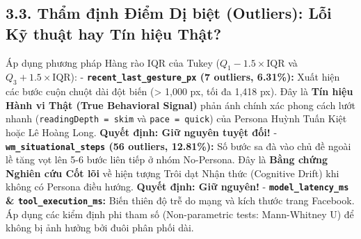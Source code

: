 \documentclass[11pt]{article}
\begin{document}
    
    \subsection{3.3. Thẩm định Điểm Dị biệt (Outliers): Lỗi Kỹ thuật hay Tín
hiệu
Thật?}\label{thux1ea9m-ux111ux1ecbnh-ux111iux1ec3m-dux1ecb-biux1ec7t-outliers-lux1ed7i-kux1ef9-thuux1eadt-hay-tuxedn-hiux1ec7u-thux1eadt}

Áp dụng phương pháp Hàng rào IQR của Tukey
(\(Q_1 - 1.5\times\text{IQR}\) và \(Q_3 + 1.5\times\text{IQR}\)): -
\textbf{\texttt{recent\_last\_gesture\_px} (7 outliers, 6.31\%):} Xuất
hiện các bước cuộn chuột dài đột biến (\textgreater{} 1,000 px, tối đa
1,418 px). Đây là \textbf{Tín hiệu Hành vi Thật (True Behavioral
Signal)} phản ánh chính xác phong cách lướt nhanh
(\texttt{readingDepth\ =\ skim} và \texttt{pace\ =\ quick}) của Persona
Huỳnh Tuấn Kiệt hoặc Lê Hoàng Long. \textbf{Quyết định: Giữ nguyên tuyệt
đối!} - \textbf{\texttt{wm\_situational\_steps} (56 outliers, 12.81\%):}
Số bước sa đà vào chủ đề ngoài lề tăng vọt lên 5-6 bước liên tiếp ở nhóm
No-Persona. Đây là \textbf{Bằng chứng Nghiên cứu Cốt lõi} về hiện tượng
Trôi dạt Nhận thức (Cognitive Drift) khi không có Persona điều hướng.
\textbf{Quyết định: Giữ nguyên!} - \textbf{\texttt{model\_latency\_ms}
\& \texttt{tool\_execution\_ms}:} Biến thiên độ trễ do mạng và kích
thước trang Facebook. Áp dụng các kiểm định phi tham số (Non-parametric
tests: Mann-Whitney U) để không bị ảnh hưởng bởi đuôi phân phối dài.
\end{document}
